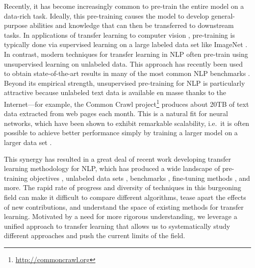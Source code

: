 Recently, it has become increasingly common to pre-train the entire model on a data-rich task. Ideally, this pre-training causes the model to develop general-purpose abilities and knowledge that can then be transferred to downstream tasks. In applications of transfer learning to computer vision \citep{oquab2014learning,jia2014caffe,huh2016makes,yosinski2014transferable}, pre-training is typically done via supervised learning on a large labeled data set like ImageNet \citep{russakovsky2015imagenet,deng2009imagenet}. In contrast, modern techniques for transfer learning in NLP often pre-train using unsupervised learning on unlabeled data. This approach has recently been used to obtain state-of-the-art results in many of the most common NLP benchmarks \citep{devlin2018bert,yang2019xlnet,dong2019unified,liu2019roberta,lan2019albert}. Beyond its empirical strength, unsupervised pre-training for NLP is particularly attractive because unlabeled text data is available en masse thanks to the Internet---for example, the Common Crawl project\footnote{\url{http://commoncrawl.org}} produces about 20TB of text data extracted from web pages each month. This is a natural fit for neural networks, which have been shown to exhibit remarkable scalability, i.e.\ it is often possible to achieve better performance simply by training a larger model on a larger data set \citep{hestness2017deep,shazeer2017outrageously,jozefowicz2016exploring,mahajan2018exploring,radford2019language,shazeer2018mesh,huang2018gpipe,keskar2019ctrl}.

This synergy has resulted in a great deal of recent work developing transfer learning methodology for NLP, which has produced a wide landscape of pre-training objectives \citep{howard2018universal,devlin2018bert,yang2019xlnet,dong2019unified}, unlabeled data sets \citep{yang2019xlnet,liu2019roberta,zellers2019defending}, benchmarks \citep{wang2019superglue,wang2018glue,conneau2018senteval}, fine-tuning methods \citep{howard2018universal,houlsby2019parameter,peters2019tune}, and more. The rapid rate of progress and diversity of techniques in this burgeoning field can make it difficult to compare different algorithms, tease apart the effects of new contributions, and understand the space of existing methods for transfer learning. Motivated by a need for more rigorous understanding, we leverage a unified approach to transfer learning that allows us to systematically study different approaches and push the current limits of the field.

